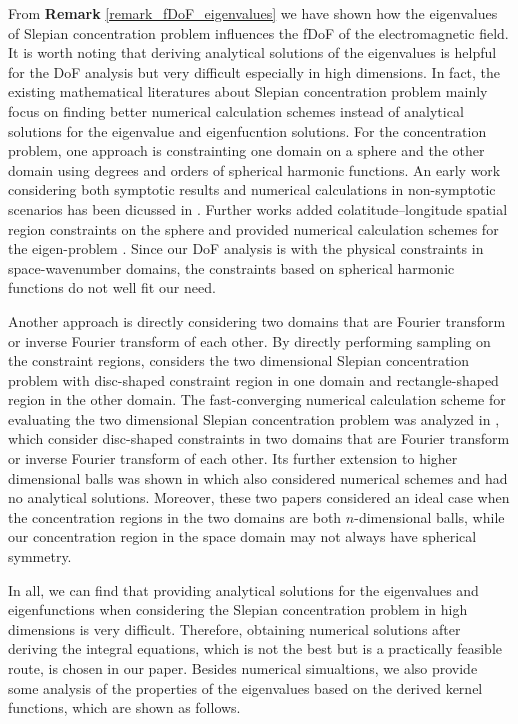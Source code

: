 \documentclass[12pt,draftclsnofoot,journal,onecolumn]{IEEEtran}
\begin{document}
{\color{red}
	From {\bf Remark} \ref{remark_fDoF_eigenvalues} we have shown how the eigenvalues of Slepian concentration problem influences the fDoF of the electromagnetic field. It is worth noting that deriving analytical solutions of the eigenvalues is helpful for the DoF analysis but very difficult especially in high dimensions. In fact, the existing mathematical literatures about Slepian concentration problem mainly focus on finding better numerical calculation schemes instead of analytical solutions for the eigenvalue and eigenfucntion solutions. 
	For the concentration problem, one approach is constrainting one domain on a sphere and the other domain using degrees and orders of spherical harmonic functions. An early work considering both symptotic results and numerical calculations in non-symptotic scenarios has been dicussed in \cite{simons2006spatiospectral}. Further works added colatitude–longitude spatial region constraints on the sphere and provided numerical calculation schemes for the eigen-problem \cite{bates2016slepian}. Since our DoF analysis is with the physical constraints in space-wavenumber domains, the constraints based on spherical harmonic functions do not well fit our need. 
	
	Another approach is directly considering two domains that are Fourier transform or inverse Fourier transform of each other. By directly performing sampling on the constraint regions, \cite{beylkin2007grids} considers the two dimensional Slepian concentration problem with disc-shaped constraint region in one domain and rectangle-shaped region in the other domain.
	The fast-converging numerical calculation scheme for evaluating the two dimensional Slepian concentration problem was analyzed in \cite{shkolnisky2007prolate}, which consider disc-shaped constraints in two domains that are Fourier transform or inverse Fourier transform of each other. 
	Its further extension to higher dimensional balls was shown in \cite{zhang2020ball} which also considered numerical schemes and had no analytical solutions. Moreover, these two papers considered an ideal case when the concentration regions in the two domains are both $n$-dimensional balls, while our concentration region in the space domain may not always have spherical symmetry. 
	
	In all, we can find that providing analytical solutions for the eigenvalues and eigenfunctions when considering the Slepian concentration problem in high dimensions is very difficult. Therefore, obtaining numerical solutions after deriving the integral equations, which is not the best but is a practically feasible route, is chosen in our paper. Besides numerical simualtions, we also provide some analysis of the properties of the eigenvalues based on the derived kernel functions, which are shown as follows.

}
\end{document}
